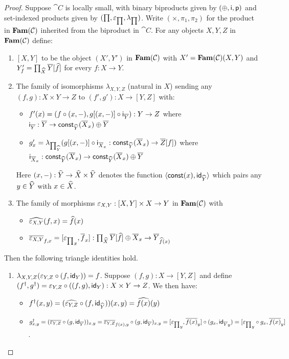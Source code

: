 \begin{proof}
Suppose $\cat{C}$ is locally small, with binary biproducts given by $(\oplus,\mathsf{i},\mathsf{p})$ and set-indexed
products given by $(\prod,\varepsilon_{\prod},\lambda_{\prod})$. Write $(\times,\pi_1,\pi_2)$ for the product in
$\mathbf{Fam}(\mathcal{C})$ inherited from the biproduct in $\cat{C}$. For any objects $X, Y, Z$ in $\mathbf{Fam}(\mathcal{C})$
define:

\begin{enumerate}
\item $[X, Y]$ to be the object $(X',Y')$ in $\mathbf{Fam}(\mathcal{C})$ with $X' = \mathbf{Fam}(\mathcal{C})(X,Y)$ and $Y'_f =
\prod_{\widehat{X}}\overline{Y}[\widehat{f}]$ for every $f: X \to Y$.
\item The family of isomorphisms $\lambda_{X,Y,Z}$ (natural in $X$) sending any $(f, g): X \times Y \to Z$ to
$(f', g'): X \to [Y, Z]$ with:
\begin{itemize}
\item $f'(x) = (f \circ (x, -), g[(x,-)] \circ \mathsf{i}_{\overline{Y}}):
Y \to Z$ where $\mathsf{i}_{\overline{Y}}: \overline{Y} \to \mathsf{const}_{\widehat{Y}}(\overline{X}_x) \oplus \overline{Y}$
\item $g'_x = \lambda_{\prod_{\widehat{Y}}}(g[(x,-)] \circ \mathsf{i}_{\overline{X}_x}:
\mathsf{const}_{\widehat{Y}}(\overline{X}_x) \to \overline{Z}[f])$ where $\mathsf{i}_{\overline{X}_x}: \mathsf{const}_{\widehat{Y}}(\overline{X}_x)
\to \mathsf{const}_{\widehat{Y}}(\overline{X}_x) \oplus \overline{Y}$
\end{itemize}
Here $(x,-): \widehat{Y} \to \widehat{X} \times \widehat{Y}$ denotes the function $\langle \mathsf{const}(x), \mathsf{id}_{\widehat{Y}}\rangle$ which
pairs any $y \in \widehat{Y}$ with $x \in \widehat{X}$.
\item The family of morphisms $\varepsilon_{X,Y}: [X, Y] \times X \to Y$ in $\mathbf{Fam}(\mathcal{C})$ with
\begin{itemize}
\item $\widehat{\varepsilon_{X,Y}}(f, x) = \widehat{f}(x)$
\item $\overline{\varepsilon_{X,Y}}_{f, x} = [{\varepsilon_{\prod}}_x, \overline{f}_x]:
\prod_{\widehat{X}}\overline{Y}[\widehat{f}] \oplus \overline{X}_x \to \overline{Y}_{\widehat{f}(x)}$
\end{itemize}
\end{enumerate}

Then the following triangle identities hold.
\begin{enumerate}
\item $\lambda_{X,Y,Z}(\varepsilon_{Y,Z} \circ (f, \mathsf{id}_Y)) = f$. Suppose $(f,g): X \to [Y,Z]$ and define
$(f^\dagger, g^\dagger) = \varepsilon_{Y,Z} \circ ((f,g), \mathsf{id}_Y): X \times Y \to Z$. We then have:
\begin{itemize}
\item $f^\dagger(x,y) = (\widehat{\varepsilon_{Y,Z}} \circ (f, \mathsf{id}_{\widehat{Y}}))(x,y) = \widehat{f(x)}(y)$
\item $g^\dagger_{x,y} = (\overline{\varepsilon_{Y,Z}} \circ (g, \mathsf{id}_{\overline{Y}}))_{x,y} = \overline{\varepsilon_{Y,Z}}_{f(x), y}
\circ (g, \mathsf{id}_{\overline{Y}})_{x,y} = [{\varepsilon_{\prod}}_y, \overline{f(x)}_y] \circ (g_x, {\mathsf{id}_{\overline{Y}}}_y) =
[{\varepsilon_{\prod}}_y \circ g_x, \overline{f(x)}_y]$.
\end{itemize}


\end{enumerate}
\end{proof}
